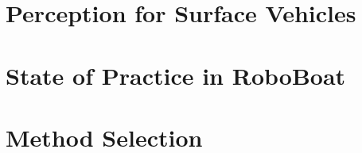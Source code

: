 \section{Perception for Surface Vehicles}
\label{sec:literature-review-perception}

\section{State of Practice in RoboBoat}
\label{sec:literature-review-roboboat}

\section{Method Selection}
\label{sec:literature-review-method-selection}
